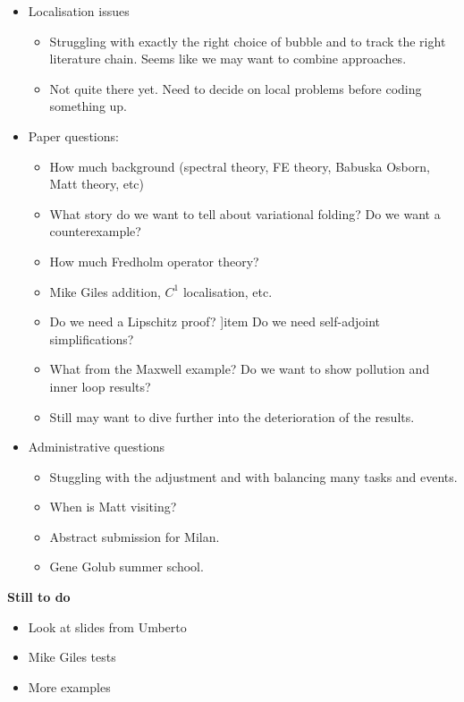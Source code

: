 \documentclass[12pt,a4paper]{article}
\begin{document}
\begin{itemize}
    \item Localisation issues
    \begin{itemize}
        \item Struggling with exactly the right choice of bubble and to track the right literature chain. Seems like we may want to combine approaches. 
        \item Not quite there yet. Need to decide on local problems before coding something up. 
    \end{itemize}
    \item Paper questions:
    \begin{itemize}
        \item How much background (spectral theory, FE theory, Babuska Osborn, Matt theory, etc)
        \item What story do we want to tell about variational folding? Do we want a counterexample? 
        \item How much Fredholm operator theory?
        \item Mike Giles addition, $C^1$ localisation, etc.
        \item Do we need a Lipschitz proof? 
        ]item Do we need self-adjoint simplifications?
        \item What from the Maxwell example? Do we want to show pollution and inner loop results? 
        \item Still may want to dive further into the deterioration of the results. 
    \end{itemize}
    \item Administrative questions
    \begin{itemize}
    \item Stuggling with the adjustment and with balancing many tasks and events. 
    \item When is Matt visiting?
    \item Abstract submission for Milan.
    \item Gene Golub summer school. 
\end{itemize}
\end{itemize}

\textbf{Still to do}

\begin{itemize}
    \item Look at slides from Umberto
    \item Mike Giles tests
    \item More examples
\end{itemize}
\end{document}
